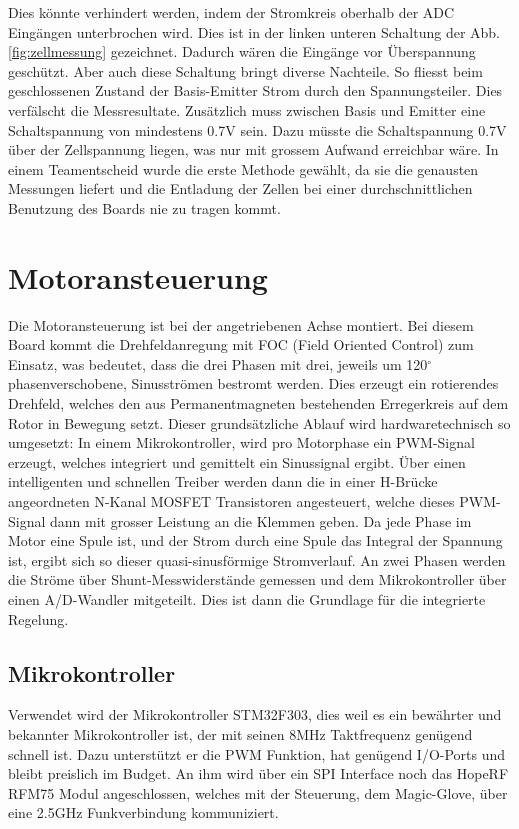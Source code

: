 Dies könnte verhindert werden, indem der Stromkreis oberhalb der ADC Eingängen unterbrochen wird. Dies ist in der linken unteren Schaltung der Abb.\ref{fig:zellmessung} gezeichnet. Dadurch wären die Eingänge vor Überspannung geschützt. Aber auch diese Schaltung bringt diverse Nachteile. So fliesst beim geschlossenen Zustand der Basis-Emitter Strom durch den Spannungsteiler. Dies verfälscht die Messresultate. Zusätzlich muss zwischen Basis und Emitter eine Schaltspannung von mindestens 0.7V sein. Dazu müsste die Schaltspannung 0.7V über der Zellspannung liegen, was nur mit grossem Aufwand erreichbar wäre. 
In einem Teamentscheid wurde die erste Methode gewählt, da sie die genausten Messungen liefert und die Entladung der Zellen bei einer durchschnittlichen Benutzung des Boards nie  zu tragen kommt.

\section{Motoransteuerung}
\label{HW_Motoransteuerung}
Die Motoransteuerung ist bei der angetriebenen Achse montiert. Bei diesem Board kommt die Drehfeldanregung mit FOC (Field Oriented Control) zum Einsatz, was bedeutet, dass die drei Phasen mit drei, jeweils um 120\(^\circ\) phasenverschobene, Sinusströmen bestromt werden. Dies erzeugt ein rotierendes Drehfeld, welches den aus Permanentmagneten bestehenden Erregerkreis auf dem Rotor in Bewegung setzt. Dieser grundsätzliche Ablauf wird hardwaretechnisch so umgesetzt:
In einem Mikrokontroller, wird pro Motorphase ein PWM-Signal erzeugt, welches integriert und gemittelt ein Sinussignal ergibt. Über einen intelligenten und schnellen Treiber werden dann die in einer H-Brücke angeordneten N-Kanal MOSFET Transistoren angesteuert, welche dieses PWM-Signal dann mit grosser Leistung an die Klemmen geben. Da jede Phase im Motor eine Spule ist, und der Strom durch eine Spule das Integral der Spannung ist, ergibt sich so dieser quasi-sinusförmige Stromverlauf.
An zwei Phasen werden die Ströme über Shunt-Messwiderstände gemessen und dem Mikrokontroller über einen A/D-Wandler mitgeteilt. Dies ist dann die Grundlage für die integrierte Regelung.

\subsection*{Mikrokontroller}
Verwendet wird der Mikrokontroller STM32F303, dies weil es ein bewährter und bekannter Mikrokontroller ist, der mit seinen 8MHz Taktfrequenz genügend schnell ist. Dazu unterstützt er die PWM Funktion, hat genügend I/O-Ports und bleibt preislich im Budget.
An ihm wird über ein SPI Interface noch das HopeRF RFM75 Modul angeschlossen, welches mit der Steuerung, dem Magic-Glove, über eine 2.5GHz Funkverbindung kommuniziert.

